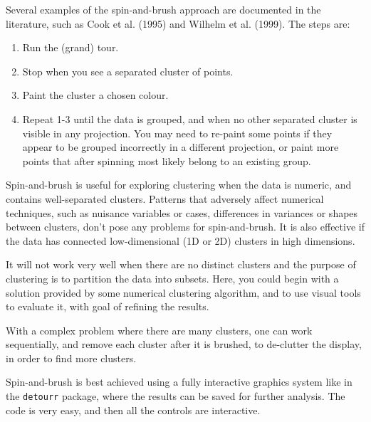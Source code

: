 \documentclass[
  letterpaper,
]{krantz}
\providecommand{\tightlist}{%
  \setlength{\itemsep}{0pt}\setlength{\parskip}{0pt}}
\begin{document}
 

Several examples of the spin-and-brush approach are documented in the
literature, such as Cook et al. (1995) and Wilhelm et al. (1999). The
steps are:

\begin{enumerate}
\def\labelenumi{\arabic{enumi}.}
\tightlist
\item
  Run the (grand) tour.
\item
  Stop when you see a separated cluster of points.
\item
  Paint the cluster a chosen colour.
\item
  Repeat 1-3 until the data is grouped, and when no other separated
  cluster is visible in any projection. You may need to re-paint some
  points if they appear to be grouped incorrectly in a different
  projection, or paint more points that after spinning most likely
  belong to an existing group.
\end{enumerate}

Spin-and-brush is useful for exploring clustering when the data is
numeric, and contains well-separated clusters. Patterns that adversely
affect numerical techniques, such as nuisance variables or cases,
differences in variances or shapes between clusters, don't pose any
problems for spin-and-brush. It is also effective if the data has
connected low-dimensional (1D or 2D) clusters in high dimensions.

It will not work very well when there are no distinct clusters and the
purpose of clustering is to partition the data into subsets. Here, you
could begin with a solution provided by some numerical clustering
algorithm, and to use visual tools to evaluate it, with goal of refining
the results.

With a complex problem where there are many clusters, one can work
sequentially, and remove each cluster after it is brushed, to de-clutter
the display, in order to find more clusters.

Spin-and-brush is best achieved using a fully interactive graphics
system like in the \texttt{detourr} package, where the results can be
saved for further analysis. The code is very easy, and then all the
controls are interactive.

\end{document}
